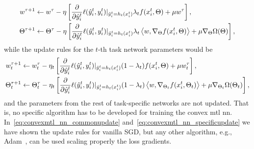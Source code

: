 \begin{equation}\label{eq:convexmtl_nn_commonupdate}
    \begin{aligned}
        w^{\tau + 1} &\gets w^\tau - \eta \left[  \frac{\partial}{\partial \hat{y}_i^t}  \lossf(\hat{y}_i^t, y_i^t) \vert_{\hat{y}_i^t = h_t(x_i^t)} \lambda_t  f(x_i^t, \Theta) + \mu w^\tau \right], \\
        \Theta^{\tau + 1} &\gets \Theta^\tau - \eta \left[ \frac{\partial}{\partial \hat{y}_i^t}  \lossf(\hat{y}_i^t, y_i^t) \vert_{\hat{y}_i^t = h_t(x_i^t)}  \lambda_t  \dotp{w}{\nabla_\Theta f(x_i^t, \Theta)} + \mu  \nabla_\Theta \Omega( \Theta)  \right],
    \end{aligned}
\end{equation}
while the update rules for the $t$-th task network parameters would be
\begin{equation}\label{eq:convexmtl_nn_specificupdate}
    \begin{aligned}
        w_t^{\tau + 1} &\gets w_t^\tau - \eta_t \left[  \frac{\partial}{\partial \hat{y}_i^t}  \lossf(\hat{y}_i^t, y_i^t) \vert_{\hat{y}_i^t = h_t(x_i^t)} (1 - \lambda_t)  f(x_i^t, \Theta) + \mu w_t^\tau \right], \\
        \Theta_t^{\tau + 1} &\gets \Theta_t^\tau - \eta_t \left[ \frac{\partial}{\partial \hat{y}_i^t}  \lossf(\hat{y}_i^t, y_i^t) \vert_{\hat{y}_i^t = h_t(x_i^t)}  (1 - \lambda_t)  \dotp{w}{\nabla_{\Theta_t} f(x_i^t, \Theta_t)} + \mu  \nabla_{\Theta_t} \Omega( \Theta_t) \right],
    \end{aligned}
\end{equation}
and the parameters from the rest of task-specific networks are not updated.
%
That is, no specific algorithm has to be developed for training the convex \acrshort{mtl} \acrshort{nn}. In~\eqref{eq:convexmtl_nn_commonupdate} and~\eqref{eq:convexmtl_nn_specificupdate} we have shown the update rules for vanilla SGD, but any other algorithm, e.g., Adam~\citep{KingmaB14}, can be used scaling properly the loss gradients.





